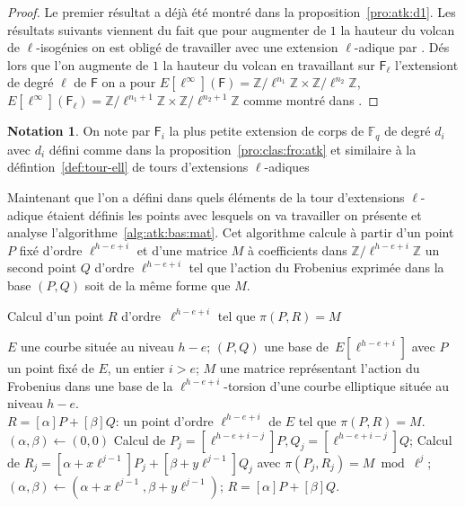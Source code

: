 \documentclass[10pt,a4paper]{book}
\theoremstyle{plain}
\theoremstyle{definition}
\theoremstyle{definition}
\theoremstyle{definition}
\theoremstyle{definition}
\theoremstyle{remark}
\theoremstyle{remark}
\theoremstyle{definition}
\newtheorem{nota}[thm]{Notation}
\begin{document}
\begin{proof}
Le premier résultat a déjà été montré dans la proposition~\ref{pro:atk:d1}.
Les résultats suivants viennent du fait que pour augmenter de $1$ la hauteur du
volcan de $\ell$-isogénies on est obligé de travailler avec une extension 
$\ell$-adique par \cite[Lemme 6.5.2]{Fouquet01}. Dés lors que l'on augmente de 
$1$ la hauteur du volcan en travaillant sur $\mathsf{F}_{\ell}$ l'extensiont de
degré $\ell$ de $\mathsf{F}$ on a pour $E[\ell^{\infty}](\mathsf{F})= \mathbb{Z}/
\ell^{n_1} \mathbb{Z} \times \mathbb{Z}/\ell^{n_2} \mathbb{Z}$, $E[\ell^{\infty}
](\mathsf{F}_{\ell})= \mathbb{Z}/\ell^{n_1+1} \mathbb{Z} \times \mathbb{Z}/\ell^{n_2+1} 
\mathbb{Z}$ comme montré dans \cite[§5.3.1]{Ionica2010}.
\end{proof}

\begin{nota}
On note par $\mathsf{F}_i$ la plus petite extension de corps de 
$\mathbb{F}_q$ de degré $d_i$ avec $d_i$ défini comme dans la 
proposition~\ref{pro:clas:fro:atk} et similaire à la 
défintion~\ref{def:tour-ell} de tours d'extensions $\ell$-adiques
\end{nota}

Maintenant que l'on a défini dans quels éléments de la tour d'extensions 
$\ell$-adique étaient définis les points avec lesquels on va travailler on 
présente et analyse l'algorithme~\ref{alg:atk:bas:mat}. Cet algorithme calcule 
à partir d'un point $P$ fixé d'ordre $\ell^{h-e+i}$ et d'une matrice $M$ à 
coefficients dans $\mathbb{Z}/\ell^{h-e+i} \mathbb{Z}$ un second point $Q$ 
d'ordre $\ell^{h-e+i}$ tel que l'action du Frobenius exprimée dans la base 
$(P,Q)$ soit de la même forme que $M$.

\begin{algorithm}
\caption{\label{alg:atk:bas:mat}Calcul d'un point $R$ d'ordre~$\ell^{h-e+i}$ tel que $\pi(P,R)=M$}
\begin{algorithmic}[1]
\REQUIRE $E$ une courbe située au niveau $h-e$; $(P, Q)$ une base de~$E[\ell^{h-e+i}]$ avec $P$ un point fixé de $E$, un entier $i > e$; $M$ une matrice représentant l'action du Frobenius dans une base de la $\ell^{h-e+i}$-torsion d'une courbe elliptique située au niveau $h-e$.\\
\ENSURE $R=[\alpha]P+ [\beta]Q $: un point d'ordre $\ell^{h-e+i}$ de $E$ tel que $\pi(P,R)=M$.
\STATE $(\alpha, \beta ) \leftarrow (0,0)$
\STATE Calcul de $P_j=[\ell^{h-e+i-j}]P, Q_j=[\ell^{h-e+i-j}]Q$; \label{alg:atk:bas:niv}
\STATE Calcul de $R_j=[\alpha + x\ell^{j-1}]P_j+[\beta +y\ell^{j-1}]Q_j$ avec $\pi(P_j,R_j)=M\bmod \ell^{j}$; \label{alg:atk:coef:int}
\STATE $(\alpha, \beta) \leftarrow (\alpha + x\ell^{j-1}, \beta +y\ell^{j-1})$;
\ENDFOR
\RETURN\label{alg:atk:horizontal:final} $R =[\alpha]P+ [\beta]Q$. 
\end{algorithmic}
\end{algorithm}
\end{document}
